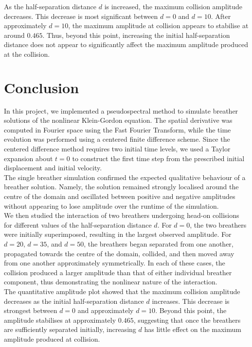 \documentclass[12pt]{article}
\begin{document}
As the half-separation distance \(d\) is increased, the maximum collision amplitude decreases. This decrease is most significant between \(d=0\) and \(d=10\). After approximately \(d=10\), the maximum amplitude at collision appears to stabilise at around \(0.465\). Thus, beyond this point, increasing the initial half-separation distance does not appear to significantly affect the maximum amplitude produced at the collision.\\

\section*{Conclusion}

In this project, we implemented a pseudospectral method to simulate breather solutions of the nonlinear Klein-Gordon equation. The spatial derivative was computed in Fourier space using the Fast Fourier Transform, while the time evolution was performed using a centered finite difference scheme. Since the centered difference method requires two initial time levels, we used a Taylor expansion about \(t=0\) to construct the first time step from the prescribed initial displacement and initial velocity.\\

The single breather simulation confirmed the expected qualitative behaviour of a breather solution. Namely, the solution remained strongly localised around the centre of the domain and oscillated between positive and negative amplitudes without appearing to lose amplitude over the runtime of the simulation.\\

We then studied the interaction of two breathers undergoing head-on collisions for different values of the half-separation distance \(d\). For \(d=0\), the two breathers were initially superimposed, resulting in the largest observed amplitude. For \(d=20\), \(d=35\), and \(d=50\), the breathers began separated from one another, propagated towards the centre of the domain, collided, and then moved away from one another approximately symmetrically. In each of these cases, the collision produced a larger amplitude than that of either individual breather component, thus demonstrating the nonlinear nature of the interaction.\\

The quantitative amplitude plot showed that the maximum collision amplitude decreases as the initial half-separation distance \(d\) increases. This decrease is strongest between \(d=0\) and approximately \(d=10\). Beyond this point, the amplitude stabilises at approximately \(0.465\), suggesting that once the breathers are sufficiently separated initially, increasing \(d\) has little effect on the maximum amplitude produced at collision.\\
\end{document}
